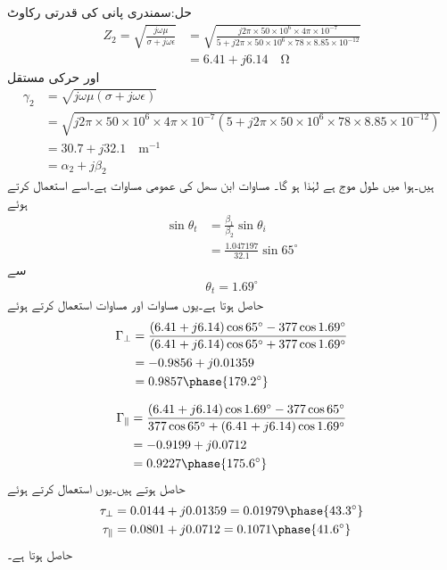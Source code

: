 حل:سمندری پانی کی قدرتی رکاوٹ
\begin{align*}
Z_2=\sqrt{\frac{j\omega \mu}{\sigma+j\omega \epsilon}}&=\sqrt{\frac{j 2\pi \times 50\times 10^6\times 4 \pi \times 10^{-7}}{5+j 2\pi\times 50 \times 10^6 \times 78\times 8.85\times 10^{-12}}}\\
&=6.41+j6.14  \quad \si{\ohm}
\end{align*}
اور حرکی مستقل
\begin{align*}
\gamma_2&=\sqrt{j\omega \mu(\sigma+j\omega \epsilon)}\\
&=\sqrt{j 2\pi \times 50\times 10^6\times 4 \pi \times 10^{-7}(5+j 2\pi\times 50 \times 10^6 \times 78\times 8.85\times 10^{-12})}\\
&=30.7+j 32.1 \quad \si{\meter^{-1}}\\
&=\alpha_2+j\beta_2
\end{align*}
ہیں۔ہوا میں طول موج  ہے لہٰذا  ہو گا۔ مساوات  ابن سھل کی عمومی مساوات ہے۔اسے استعمال کرتے ہوئے
\begin{align*}
\sin \theta_t&=\frac{\beta_1}{\beta_2} \sin \theta_i\\
&=\frac{1.047197}{32.1} \sin 65^{\circ}
\end{align*}
سے
\begin{align*}
\theta_t=1.69^{\circ}
\end{align*}
حاصل ہوتا ہے۔یوں مساوات  اور مساوات  استعمال کرتے ہوئے
\begin{align*}
\Gamma_{\perp}&=\frac{(6.41+j6.14) \cos 65^{\circ} -377 \cos 1.69^{\circ}}{(6.41+j6.14) \cos 65^{\circ} +377 \cos 1.69^{\circ}}\\
&=-0.9856+j0.01359\\
&=0.9857\phase{179.2^{\circ}}
\end{align*}

\begin{align*}
\Gamma_{\parallel} &=\frac{(6.41+j6.14) \cos 1.69^{\circ} -377 \cos 65^{\circ}}{377 \cos 65^{\circ}+(6.41+j6.14) \cos 1.69^{\circ}}\\
&=-0.9199+j0.0712\\
&=0.9227\phase{175.6^{\circ}}
\end{align*}
حاصل ہوتے ہیں۔یوں  استعمال کرتے ہوئے
\begin{align*}
\tau_{\perp}&=0.0144+j0.01359=0.01979\phase{43.3^{\circ}}\\
\tau_{\parallel}&=0.0801+j0.0712=0.1071\phase{41.6^{\circ}}
\end{align*}
حاصل ہوتا ہے۔

